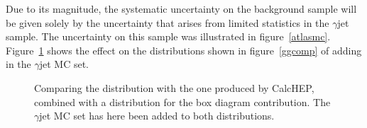 Due to its magnitude, the systematic uncertainty on the background sample will be given solely by the uncertainty that arises from limited statistics in the \atlas{} $\gamma$jet sample. The uncertainty on this sample was illustrated in figure~\ref{atlasmc}. Figure~\ref{mccompjet} shows the effect on the distributions shown in figure~\ref{ggcomp} of adding in the $\gamma$jet MC set.

\begin{figure}[htp]
\begin{minipage}[b]{.69\textwidth}
\begin{infilsf} \tiny

\end{infilsf}
\end{minipage}
\begin{minipage}[b]{.3\textwidth}
\caption{Comparing the \atlas{} distribution with the one produced by CalcHEP, combined with a distribution for the box diagram contribution. The \atlas{} $\gamma$jet MC set has here been added to both distributions.}\label{mccompjet}
\end{minipage}
\end{figure}

